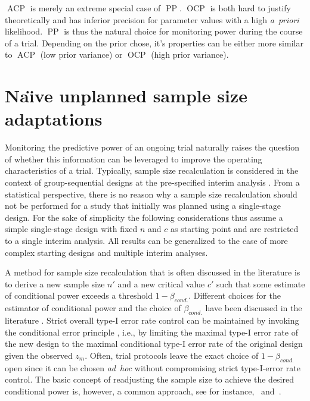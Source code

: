 \documentclass[12pt]{article}
\newcommand{\ACP}{\ensuremath{\operatorname{ACP}}}
\newcommand{\OCP}{\ensuremath{\operatorname{OCP}}}
\newcommand{\PP}{\ensuremath{\operatorname{PP}}}
\begin{document}
$\ACP$ is merely an extreme special case of $\PP$.
$\OCP$ is both hard to justify theoretically and has inferior precision
for parameter values with a high \textit{a~priori} likelihood.
$\PP$ is thus the natural choice for monitoring power during the course of a trial.
Depending on the prior chose, it's properties can be either more similar to $\ACP$ (low prior variance) or $\OCP$ (high prior variance).



\section{Na\"{\i}ve unplanned sample size adaptations}
\label{sec:naive-adaptations}

Monitoring the predictive power of an ongoing trial naturally raises the question of whether this information can be leveraged to improve the operating characteristics of a trial.
Typically, sample size recalculation is considered in the context of group-sequential designs at the pre-specified interim analysis \cite{proschan1995,brannath2004,bauer2016}.
From a statistical perspective,
there is no reason why a sample size recalculation should not be
performed for a study that initially was planned using a single-stage design.
For the sake of simplicity the following considerations thus assume a simple
single-stage design with fixed $n$ and $c$ as starting point and are
restricted to a single interim analysis.
All results can be generalized to the case of more complex starting designs and multiple interim analyses.

A method for sample size recalculation that is often discussed in the literature is to derive a new sample size $n'$ and a new critical value $c'$ such that some estimate of conditional power exceeds a threshold $1-\beta_{cond.}$.
Different choices for the estimator of conditional power
and the choice of $\beta_{cond.}$ have been discussed in the literature \cite{proschan1995,brannath2004,bauer2016}.
Strict overall type-I error rate control can be maintained by invoking the conditional error principle \cite{muller2001,muller2004,brannath2012}, i.e., by limiting the maximal type-I error rate of the new design to the maximal conditional type-I error rate of the original design given the observed $z_m$.
Often, trial protocols leave the exact choice of $1-\beta_{cond.}$ open since it can be chosen \textit{ad~hoc}
without compromising strict type-I-error rate control.
The basic concept of readjusting the sample size to achieve the desired conditional power is, however, a common approach, see for instance,~\cite{bhatt2013} and~\cite{mehta2009}.
\end{document}
